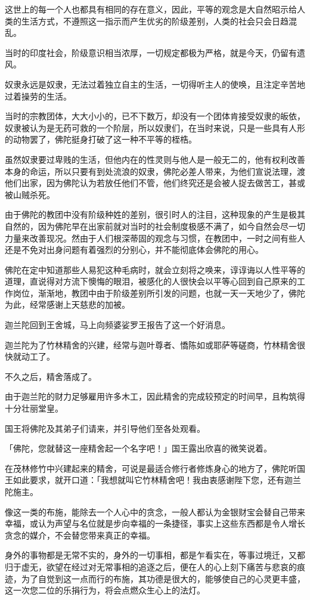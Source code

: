 \documentclass[twoside,openany]{book}
\begin{document}
这世上的每一个人也都具有相同的存在意义，因此，平等的观念是大自然昭示给人类的生活方式，不遵照这一指示而产生优劣的阶级差别，人类的社会只会日趋混乱。

当时的印度社会，阶级意识相当浓厚，一切规定都极为严格，就是今天，仍留有遗风。

奴隶永远是奴隶，无法过着独立自主的生活，一切得听主人的使唤，且注定辛苦地过着操劳的生活。

当时的宗教团体，大大小小的，已不下数万，却没有一个团体肯接受奴隶的皈依，奴隶被认为是无药可救的一个阶层，所以奴隶们，在当时来说，只是一些具有人形的动物罢了，佛陀挺身打破了这一种不平等的桎梏。

虽然奴隶要过卑贱的生活，但他内在的性灵则与他人是一般无二的，他有权利改善本身的命运，所以只要有到处流浪的奴隶，佛陀必差人带来，为他们宣说法理，渡他们出家，因为佛陀认为若放任他们不管，他们终究还是会被人捉去做苦工，甚或被山贼杀死。

由于佛陀的教团中没有阶级种姓的差别，很引时人的注目，这种现象的产生是极其自然的，因为佛陀早在出家前就对当时的社会制度极感不满了，如今自然会尽一切力量来改善现况。然由于人们根深蒂固的观念与习惯，在教团中，一时之间有些人还是不免对出身问题有着强烈的分别心，并不能彻底体会佛陀的用心。

佛陀在定中知道那些人易犯这种毛病时，就会立刻将之唤来，谆谆诲以人性平等的道理，直说得对方流下懊悔的眼泪，被感化的人很快会以平等心回到自己原来的工作岗位，渐渐地，教团中由于阶级差别所引发的问题，也就一天一天地少了，佛陀为此，经常感谢上天慈悲的加被。

迦兰陀回到王舍城，马上向频婆娑罗王报告了这一个好消息。

迦兰陀为了竹林精舍的兴建，经常与迦叶尊者、憍陈如或耶萨等磋商，竹林精舍很快就动工了。

不久之后，精舍落成了。

由于迦兰陀的财力足够雇用许多木工，因此精舍的完成较预定的时间早，且构筑得十分壮丽堂皇。

国王将佛陀及其弟子们请来，并引导他们至各处观看。

「佛陀，您就替这一座精舍起一个名字吧！」国王露出欣喜的微笑说着。

在茂林修竹中兴建起来的精舍，可说是最适合修行者修炼身心的地方了，佛陀听国王如此要求，就开口道：「我想就叫它竹林精舍吧！我由衷感谢陛下您，还有迦兰陀施主。

像这一类的布施，能除去一个人心中的贪念，一般人都认为金银财宝会替自己带来幸福，或认为声望与名位就是步向幸福的一条捷径，事实上这些东西都是令人增长贪念的媒介，不会替您带来真正的幸福。

身外的事物都是无常不实的，身外的一切事相，都是乍看实在，等事过境迁，又都归于虚无，欲望在经过对无常事相的追逐之后，便在人的心上刻下痛苦与悲哀的痕迹，为了自觉到这一点而行的布施，其功德是很大的，能够使自己的心灵更丰盛，这一次您二位的乐捐行为，将会点燃众生心上的法灯。
\end{document}
